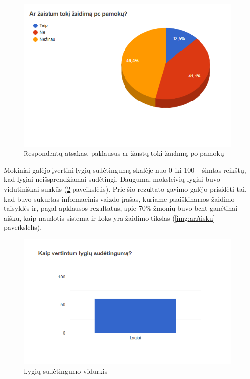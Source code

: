 \documentclass{VUMIFPSkursinis}
\begin{document}
\begin{figure}[H]
\centering
\includegraphics[scale=0.8]{img/arZaistum.png}
\caption{Respondentų atsakas, paklausus ar žaistų tokį žaidimą po pamokų}
\label{img:arZaistum}
\end{figure}

Mokiniai galėjo įvertini lygių sudėtingumą skalėje nuo 0 iki 100 -- šimtas reikštų, kad lygiai neišsprendžiamai sudėtingi. Daugumai moksleivių lygiai buvo vidutiniškai sunkūs (\ref{img:lygiuSudetingumas} paveikslėlis). Prie šio rezultato gavimo galėjo prisidėti tai, kad buvo sukurtas informacinis vaizdo įrašas, kuriame paaiškinamos žaidimo taisyklės ir, pagal apklausos rezultatus, apie 70\% žmonių buvo bent ganėtinai aišku, kaip naudotis sistema ir koks yra žaidimo tikslas (\ref{img:arAisku} paveikslėlis).

\begin{figure}[H]
\centering
\includegraphics[scale=0.8]{img/sudetingumas.png}
\caption{Lygių sudėtingumo vidurkis}
\label{img:lygiuSudetingumas}
\end{figure}
\end{document}
